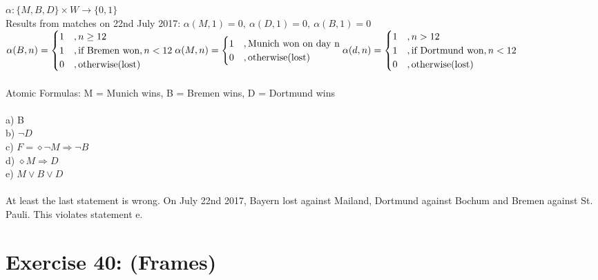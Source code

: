 \documentclass[12pt]{article}
\begin{document}
$\alpha : \{M, B, D\} \times W \rightarrow \{0,1\}$\\
Results from matches on 22nd July 2017: $\alpha (M,1) = 0,\ \alpha (D,1) = 0,\ \alpha (B,1) = 0$\\
$\alpha(B,n) =
	\begin{cases}
	1 &, n \geq 12 \\
	1 &, \text{if Bremen won}, n < 12 \\
	0 & , \text{otherwise(lost)}
	\end{cases} \\
\alpha(M,n) =
	\begin{cases}
		1 &, \text{Munich won on day n} \\
		0 & , \text{otherwise(lost)}
	\end{cases} \\
\alpha(d,n) =
	\begin{cases}
	1 &, n > 12 \\
	1 &, \text{if Dortmund won}, n < 12 \\
	0 & , \text{otherwise(lost)}
	\end{cases} \\
$\\ \\
Atomic Formulas: M = Munich wins, B = Bremen wins, D = Dortmund wins\\ \\
a) B\\
b) $\lnot D$\\
c) $F = \diamond \lnot M \Rightarrow \lnot B$\\
d) $\diamond M \Rightarrow D$\\
e) $M \lor B \lor D$ \\ \\
At least the last statement is wrong. On July 22nd 2017, Bayern lost against Mailand, Dortmund against Bochum and Bremen against St. Pauli. This violates statement e. \\

\section*{Exercise 40: (Frames)}


\end{document}
